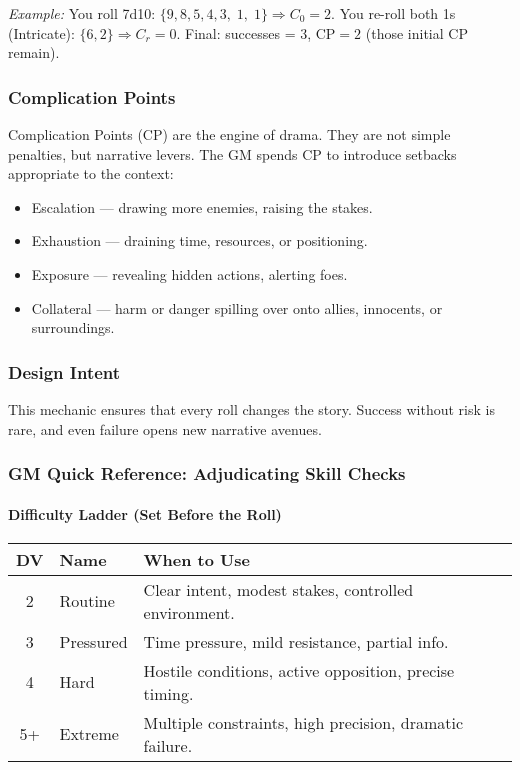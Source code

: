 \documentclass[11pt]{article}
\begin{document}
\textit{Example:} You roll 7d10: \(\{9,8,5,4,3,\;1,\;1\}\Rightarrow C_{0}=2\).
You re-roll both 1s (Intricate): \(\{6,2\}\Rightarrow C_{r}=0\).
Final: successes = 3, \(\text{CP}=2\) (those initial CP remain).

\subsubsection{Complication Points}
Complication Points (CP) are the engine of drama. They are not simple penalties, but narrative levers. The GM spends CP to introduce setbacks appropriate to the context:
\begin{itemize}
    \item Escalation — drawing more enemies, raising the stakes.
    \item Exhaustion — draining time, resources, or positioning.
    \item Exposure — revealing hidden actions, alerting foes.
    \item Collateral — harm or danger spilling over onto allies, innocents, or surroundings.
\end{itemize}

\subsubsection{Design Intent}
This mechanic ensures that every roll changes the story. Success without risk is rare, and even failure opens new narrative avenues.

\subsubsection{GM Quick Reference: Adjudicating Skill Checks}

\paragraph{Difficulty Ladder (Set Before the Roll)}
\begin{center}
\begin{tabular}{cll}
\toprule
\textbf{DV} & \textbf{Name} & \textbf{When to Use} \\
\midrule
2 & Routine & Clear intent, modest stakes, controlled environment. \\
3 & Pressured & Time pressure, mild resistance, partial info. \\
4 & Hard & Hostile conditions, active opposition, precise timing. \\
5+ & Extreme & Multiple constraints, high precision, dramatic failure. \\
\bottomrule
\end{tabular}
\end{center}
\end{document}

